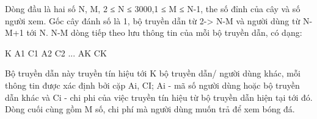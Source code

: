 Dòng đầu là hai số N, M, 2 ≤ N ≤ 3000,1 ≤ M ≤ N-1, the số đỉnh của cây  và số người xem. Gốc cây đánh số là 1, bộ truyền dẫn từ 2-> N-M và người dùng từ N-M+1 tới N.  N-M dòng tiếp theo lưu thông tin của mỗi bộ truyền dẫn, có dạng:  

   K A1 C1 A2 C2 ... AK CK  

   Bộ truyền dẫn này truyền tín hiệu tới K bộ truyền dẫn/ người dùng khác,  mỗi thông tin được xác định bởi cặp Ai, CI; Ai - mã số người dùng hoặc  bộ truyền dẫn khác và Ci - chi phi của việc truyền tín hiệu từ bộ truyền  dẫn hiện tại tới đó. Dòng cuối cùng gồm M số, chi phí mà người dùng muốn trả để xem bóng đá.